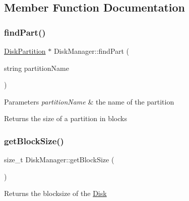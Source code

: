 \subsection{Member Function Documentation}
\mbox{\label{class_disk_manager_a08375c254bc09c8351a4f96cb669f1ab}} 
\subsubsection{\texorpdfstring{find\+Part()}{findPart()}}
{\footnotesize\ttfamily \mbox{\hyperlink{struct_disk_partition}{Disk\+Partition}} $\ast$ Disk\+Manager\+::find\+Part (\begin{DoxyParamCaption}\item[{string}]{partition\+Name }\end{DoxyParamCaption})}


\begin{DoxyParams}{Parameters}
{\em partition\+Name} & the name of the partition \\
\hline
\end{DoxyParams}
\begin{DoxyReturn}{Returns}
the size of a partition in blocks 
\end{DoxyReturn}
\mbox{\label{class_disk_manager_aabdfbb2171f3c19a3ae14f9532876404}} 
\subsubsection{\texorpdfstring{get\+Block\+Size()}{getBlockSize()}}
{\footnotesize\ttfamily size\+\_\+t Disk\+Manager\+::get\+Block\+Size (\begin{DoxyParamCaption}{ }\end{DoxyParamCaption})}

\begin{DoxyReturn}{Returns}
the blocksize of the \mbox{\hyperlink{class_disk}{Disk}} 
\end{DoxyReturn}
\mbox{\label{class_disk_manager_ae32627ccfa72013e35da637570e1729b}} 
